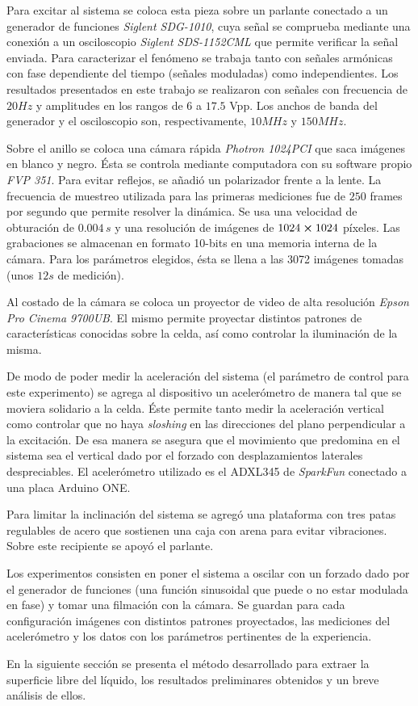 \documentclass[../main.tex]{subfiles}
\begin{document}
Para excitar al sistema se coloca esta pieza sobre un parlante conectado a un generador de funciones \textit{Siglent SDG-1010}, cuya señal se comprueba mediante una conexión a un osciloscopio \textit{Siglent SDS-1152CML} que permite verificar la señal enviada. Para caracterizar el fenómeno se trabaja tanto con señales armónicas con fase dependiente del tiempo (señales moduladas) como independientes. Los resultados presentados en este trabajo se realizaron con señales con frecuencia de $20\si{Hz}$ y amplitudes en los rangos de $6$ a $17.5$ Vpp. Los anchos de banda del generador y el osciloscopio son, respectivamente, $10\si{MHz}$ y $150\si{MHz}$.

Sobre el anillo se coloca una cámara rápida \textit{Photron 1024PCI} que saca imágenes en blanco y negro. Ésta se controla mediante computadora con su software propio \textit{FVP 351}. Para evitar reflejos, se añadió un polarizador frente a la lente. La frecuencia de muestreo utilizada para las primeras mediciones fue de $250$ frames por segundo que permite resolver la dinámica. Se usa una velocidad de obturación de $0.004\,\si{s}$ y una resolución de imágenes de $1024 \cross 1024$ píxeles. Las grabaciones se almacenan en formato 10-bits en una memoria interna de la cámara. Para los parámetros elegidos, ésta se llena a las 3072 imágenes tomadas (unos $12\si{s}$ de medición). 

Al costado de la cámara se coloca un proyector de video de alta resolución \textit{Epson Pro Cinema 9700UB}. El mismo permite proyectar distintos patrones de características conocidas sobre la celda, así como controlar la iluminación de la misma.  

De modo de poder medir la aceleración del sistema (el parámetro de control para este experimento) se agrega al dispositivo un acelerómetro de manera tal que se moviera solidario a la celda. Éste permite tanto medir la aceleración vertical como controlar que no haya \textit{sloshing} en las direcciones del plano perpendicular a la excitación. De esa manera se asegura que el movimiento que predomina en el sistema sea el vertical dado por el forzado con desplazamientos laterales despreciables. El acelerómetro utilizado es el ADXL345 de \textit{SparkFun} conectado a una placa Arduino ONE. 

Para limitar la inclinación del sistema se agregó una plataforma con tres patas regulables de acero que sostienen una caja con arena para evitar vibraciones. Sobre este recipiente se apoyó el parlante. 

Los experimentos consisten en poner el sistema a oscilar con un forzado dado por el generador de funciones (una función sinusoidal que puede o no estar modulada en fase) y tomar una filmación con la cámara. Se guardan para cada configuración imágenes con distintos patrones proyectados, las mediciones del acelerómetro y los datos con los parámetros pertinentes de la experiencia.

En la siguiente sección se presenta el método desarrollado para extraer la superficie libre del líquido, los resultados preliminares obtenidos y un breve análisis de ellos.
\end{document}
